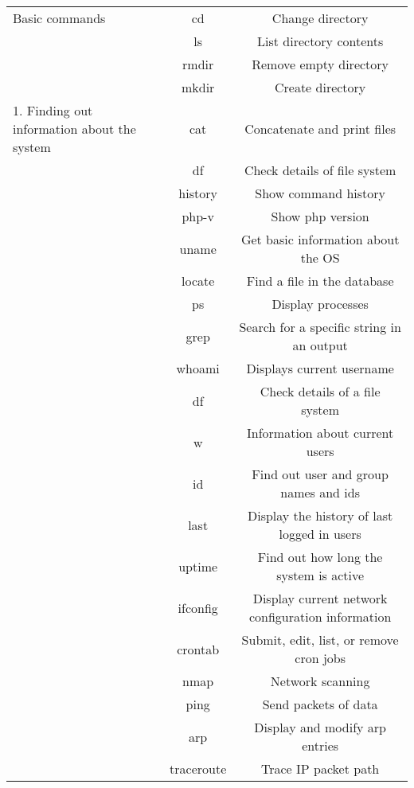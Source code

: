 \begin{table}[H]
    \centering
    \begin{tabular}{|>{\centering\arraybackslash}p{3cm}|c|c|}\hline
        Basic commands & cd & Change directory\\
         & ls & List directory contents\\
         & rmdir & Remove empty directory\\
         & mkdir & Create directory\\ \hline
         
         1. Finding out information about the system & cat & Concatenate and print files\\
         & df & Check details of file system \\
         & history & Show command history\\
         & php-v & Show php version\\
         & uname & Get basic information about the OS\\
         & locate & Find a file in the database\\
         & ps & Display processes\\
         & grep & Search for a specific string in an output\\
         & whoami & Displays current username\\
         & df & Check details of a file system\\
         & w & Information about current users\\
         & id & Find out user and group names and ids\\
         & last & Display the history of last logged in users\\
         & uptime & Find out how long the system is active\\
         & ifconfig & Display current network configuration information\\
         & crontab & Submit, edit, list, or remove cron jobs\\
         & nmap & Network scanning\\
         & ping & Send packets of data\\
         & arp & Display and modify arp entries\\
         & traceroute & Trace IP packet path\\
         \hline


\end{tabular}
\end{table}
